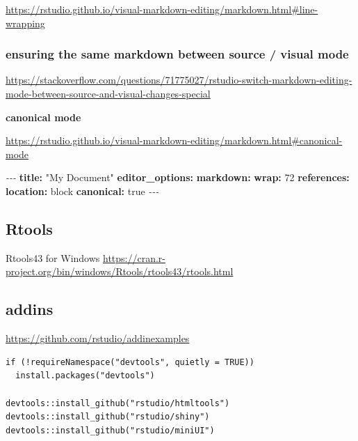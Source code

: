 \documentclass[
]{book}
\newenvironment{Shaded}{\begin{snugshade}}{\end{snugshade}}
\newcommand{\AttributeTok}[1]{\textcolor[rgb]{0.13,0.29,0.53}{#1}}
\newcommand{\CharTok}[1]{\textcolor[rgb]{0.31,0.60,0.02}{#1}}
\newcommand{\DecValTok}[1]{\textcolor[rgb]{0.00,0.00,0.81}{#1}}
\newcommand{\FunctionTok}[1]{\textcolor[rgb]{0.13,0.29,0.53}{\textbf{#1}}}
\newcommand{\KeywordTok}[1]{\textcolor[rgb]{0.13,0.29,0.53}{\textbf{#1}}}
\newcommand{\PreprocessorTok}[1]{\textcolor[rgb]{0.56,0.35,0.01}{\textit{#1}}}
\newcommand{\StringTok}[1]{\textcolor[rgb]{0.31,0.60,0.02}{#1}}
\theoremstyle{definition}
\theoremstyle{definition}
\theoremstyle{definition}
\theoremstyle{definition}
\theoremstyle{remark}
\begin{document}
\url{https://rstudio.github.io/visual-markdown-editing/markdown.html\#line-wrapping}

\hypertarget{ensuring-the-same-markdown-between-source-visual-mode}{%
\subsubsection{ensuring the same markdown between source / visual mode}\label{ensuring-the-same-markdown-between-source-visual-mode}}

\url{https://stackoverflow.com/questions/71775027/rstudio-switch-markdown-editing-mode-between-source-and-visual-changes-special}

\textbf{canonical mode}

\url{https://rstudio.github.io/visual-markdown-editing/markdown.html\#canonical-mode}

\begin{Shaded}
\begin{Highlighting}[]
\PreprocessorTok{{-}{-}{-}}
\FunctionTok{title}\KeywordTok{:}\AttributeTok{ }\StringTok{"My Document"}
\FunctionTok{editor\_options}\KeywordTok{:}
\AttributeTok{  }\FunctionTok{markdown}\KeywordTok{:}
\AttributeTok{    }\FunctionTok{wrap}\KeywordTok{:}\AttributeTok{ }\DecValTok{72}
\AttributeTok{    }\FunctionTok{references}\KeywordTok{:}\AttributeTok{ }
\AttributeTok{      }\FunctionTok{location}\KeywordTok{:}\AttributeTok{ block}
\AttributeTok{    }\FunctionTok{canonical}\KeywordTok{:}\AttributeTok{ }\CharTok{true}
\PreprocessorTok{{-}{-}{-}}
\end{Highlighting}
\end{Shaded}

\hypertarget{rtools}{%
\subsection{Rtools}\label{rtools}}

Rtools43 for Windows
\url{https://cran.r-project.org/bin/windows/Rtools/rtools43/rtools.html}

\hypertarget{addins}{%
\subsection{addins}\label{addins}}

\url{https://github.com/rstudio/addinexamples}

\begin{verbatim}
if (!requireNamespace("devtools", quietly = TRUE))
  install.packages("devtools")
  
devtools::install_github("rstudio/htmltools")
devtools::install_github("rstudio/shiny")
devtools::install_github("rstudio/miniUI")
\end{verbatim}
\end{document}
